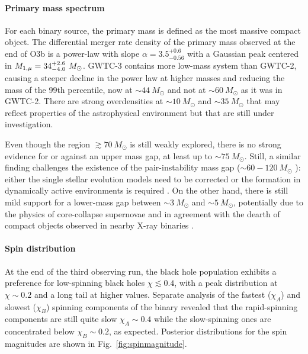\documentclass[a4paper,titlepage]{book}     	%
\newcommand{\sun}{\ensuremath{_\odot}}
\newcommand{\msun}{\ensuremath{M\sun}}
\begin{document}
\paragraph{Primary mass spectrum}
For each binary source, the primary mass is defined as the most massive compact object. The differential merger rate density of the primary mass observed at the end of O3b is a power-law with slope $\alpha = 3.5_{-0.56}^{+0.6}$ with a Gaussian peak centered in $M_{\rm 1,\mu} = 34_{-4.0}^{+2.6}~ \msun$. GWTC-3 contains more low-mass system than GWTC-2, causing a steeper decline in the power law at higher masses and reducing the mass of the 99th percentile, now at $\sim 44~\msun$ and not at $\sim 60~\msun$ as it was in GWTC-2. There are strong overdensities at $\sim 10~\msun$ and $\sim 35~\msun$ that may reflect properties of the astrophysical environment but that are still under investigation.

Even though the region $\gtrsim 70~\msun$ is still weakly explored, there is no strong evidence for or against an upper mass gap, at least up to $\sim 75~\msun$. Still, a similar finding challenges the existence of the pair-instability mass gap ($\sim 60 - 120~\msun$ \cite{spera2017_pisnSNe}): either the single stellar evolution models need to be corrected \cite{MassGapStellarEvo_Costa2021} or the formation in dynamically active environments is required \cite{Rastello2021_dynamics}. On the other hand, there is still mild support for a lower-mass gap between $\sim 3~\msun$ and $\sim 5~\msun$, potentially due to the physics of core-collapse supernovae and in agreement with the dearth of compact objects observed in nearby X-ray binaries \cite{massgapreal_ozel2010}.




\paragraph{Spin distribution}
At the end of the third observing run, the black hole population exhibits a preference for low-spinning black holes $\chi \lesssim 0.4$, with a peak distribution at $\chi \sim 0.2$ and a long tail at higher values. Separate analysis of the fastest ($\chi_A$) and slowest ($\chi_B$) spinning components of the binary revealed that the rapid-spinning components are still quite slow $\chi_A \sim 0.4$ while the slow-spinning ones are concentrated below $\chi_B \sim 0.2$, as expected. Posterior distributions for the spin magnitudes are shown in Fig.\ \ref{fig:spinmagnitude}.
\end{document}
